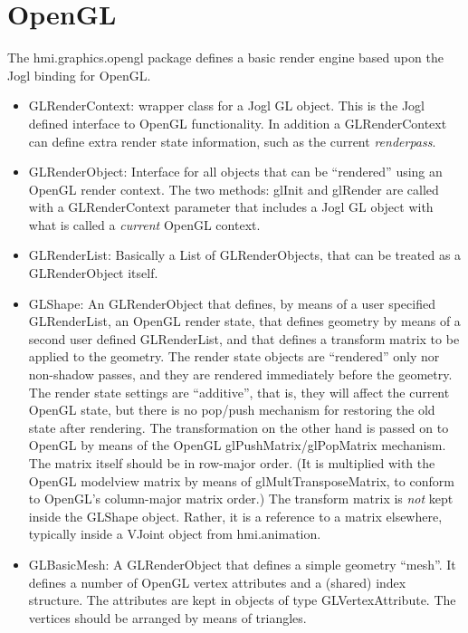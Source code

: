 
\section{OpenGL}

The hmi.graphics.opengl package defines a basic render engine based upon the Jogl binding for OpenGL.

\begin{itemize}
\item GLRenderContext: wrapper class for a Jogl GL object. This is the Jogl defined interface to OpenGL functionality.
In addition a GLRenderContext can define extra render state information, such as
the current \emph{renderpass}.
\item GLRenderObject: Interface for all objects that can be ``rendered'' using an OpenGL render context.
The two methods: glInit and glRender are called with a GLRenderContext parameter that includes
a Jogl GL object with what is called a \emph{current} OpenGL context.

\item GLRenderList: Basically a List of GLRenderObjects, that can be treated as a GLRenderObject itself.

\item GLShape: An GLRenderObject that defines, by means of a user specified GLRenderList,  an OpenGL render state,
that defines geometry by means of a second user defined GLRenderList, and
that defines a transform matrix to be applied to the geometry.
The render state objects are ``rendered'' only nor non-shadow passes, and they are rendered
immediately before the geometry.
The render state settings are ``additive'', that is, they will affect the current OpenGL state,
but there is no pop/push mechanism for restoring the old state after rendering.
The transformation on the other hand is passed on to OpenGL by means of the OpenGL glPushMatrix/glPopMatrix
mechanism. The matrix itself should be in row-major order. (It is multiplied with the OpenGL modelview matrix
by means of glMultTransposeMatrix, to conform to OpenGL's column-major matrix order.)
The transform matrix is \emph{not} kept inside the GLShape object. Rather, it is a reference to a matrix
elsewhere, typically inside a VJoint object from hmi.animation.

\item GLBasicMesh: A GLRenderObject that defines a simple geometry ``mesh''.
It defines a number of OpenGL vertex attributes and a (shared) index structure.
The attributes are kept in objects of type GLVertexAttribute.
The vertices should be arranged by means of triangles.


\end{itemize}

